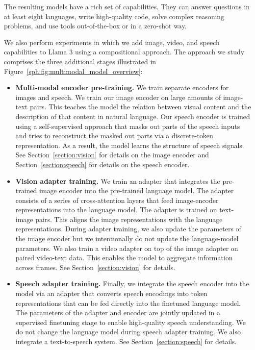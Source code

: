 \documentclass[dvipsnames]{fairmeta}
\begin{document}
The resulting models have a rich set of capabilities.
They can answer questions in at least eight languages, write high-quality code, solve complex reasoning problems, and use tools out-of-the-box or in a zero-shot way.

We also perform experiments in which we add image, video, and speech capabilities to Llama 3 using a compositional approach.
The approach we study comprises the three additional stages illustrated in Figure~\ref{sph:fig:multimodal_model_overview}:

\begin{itemize}

\item \textbf{Multi-modal encoder pre-training.} We train separate encoders for images and speech. We train our image encoder on large amounts of image-text pairs. This teaches the model the relation between visual content and the description of that content in natural language. Our speech encoder is trained using a self-supervised approach that masks out parts of the speech inputs and tries to reconstruct the masked out parts via a discrete-token representation. As a result, the model learns the structure of speech signals. See Section~\ref{section:vision} for details on the image encoder and Section~\ref{section:speech} for details on the speech encoder.

\item \textbf{Vision adapter training.} We train an adapter that integrates the pre-trained image encoder into the pre-trained language model. The adapter consists of a series of cross-attention layers that feed image-encoder representations into the language model. The adapter is trained on text-image pairs. This aligns the image representations with the language representations. During adapter training, we also update the parameters of the image encoder but we intentionally do not update the language-model parameters. We also train a video adapter on top of the image adapter on paired video-text data. This enables the model to aggregate information across frames. See Section~\ref{section:vision} for details.

\item \textbf{Speech adapter training.} Finally, we integrate the speech encoder into the model via an adapter that converts speech encodings into token representations that can be fed directly into the finetuned language model. The parameters of the adapter and encoder are jointly updated in a supervised finetuning stage to enable high-quality speech understanding. We do not change the language model during speech adapter training. We also integrate a text-to-speech system. See Section~\ref{section:speech} for details.

\end{itemize}
\end{document}

